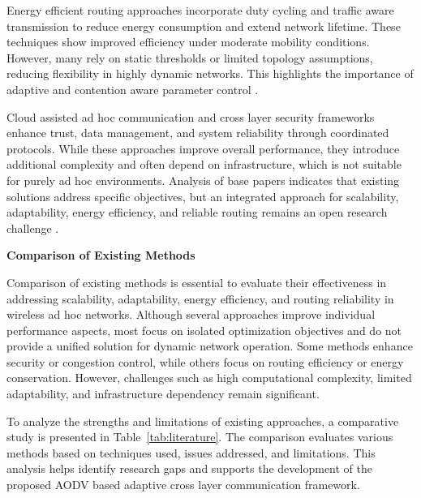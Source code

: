 \documentclass[a4paper,fleqn,final,1p]{cas-dc}
\numberwithin{equation}{section}
\begin{document}
Energy efficient routing approaches incorporate duty cycling and traffic aware transmission to reduce energy consumption and extend network lifetime. These techniques show improved efficiency under moderate mobility conditions. However, many rely on static thresholds or limited topology assumptions, reducing flexibility in highly dynamic networks. This highlights the importance of adaptive and contention aware parameter control \cite{Vastrad2025372}.

Cloud assisted ad hoc communication and cross layer security frameworks enhance trust, data management, and system reliability through coordinated protocols. While these approaches improve overall performance, they introduce additional complexity and often depend on infrastructure, which is not suitable for purely ad hoc environments. Analysis of base papers indicates that existing solutions address specific objectives, but an integrated approach for scalability, adaptability, energy efficiency, and reliable routing remains an open research challenge \cite{Ghourab20252011, Ahmed20252157}.

\textbf{Comparison of Existing Methods}

Comparison of existing methods is essential to evaluate their effectiveness in addressing scalability, adaptability, energy efficiency, and routing reliability in wireless ad hoc networks. Although several approaches improve individual performance aspects, most focus on isolated optimization objectives and do not provide a unified solution for dynamic network operation. Some methods enhance security or congestion control, while others focus on routing efficiency or energy conservation. However, challenges such as high computational complexity, limited adaptability, and infrastructure dependency remain significant.

To analyze the strengths and limitations of existing approaches, a comparative study is presented in Table~\ref{tab:literature}. The comparison evaluates various methods based on techniques used, issues addressed, and limitations. This analysis helps identify research gaps and supports the development of the proposed AODV based adaptive cross layer communication framework.
\end{document}

